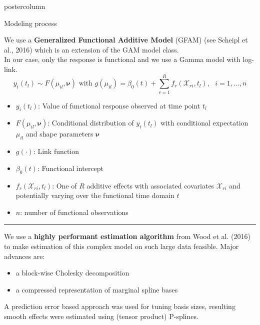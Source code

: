 \documentclass[final,hyperref={pdfpagelabels=false}]{beamer}
\newcommand{\bfBlue}[1]{\textcolor{koaladarkestblue}{\textbf{#1}}}
\newcommand*\circled[1]{\tikz[baseline=(char.base)]{
\node[shape=circle,draw,inner sep=2pt] (char) {#1};}}
\begin{document}
\begin{frame}
\begin{columns}
\begin{column}{1\textwidth}
\begin{columns}[T]
\begin{column}{.484\textwidth}
\begin{beamercolorbox}[center,wd=\textwidth]{postercolumn}
\begin{minipage}[T]{.95\textwidth}
\begin{block}{\footnotesize \circled{1} Modeling process}
\begin{minipage}[T]{.95\textwidth}  %
\vspace{1ex}
We use a \bfBlue{Generalized Functional Additive Model} (GFAM) (see Scheipl et al., 2016) which is an extension of the GAM model class.
\\
In our case, only the response is functional and we use a Gamma model with log-link.
\\
$$
y_i(t_l) \sim F(\mu_{il}, \boldsymbol{\nu}) \text{\ \ with\ \ } g(\mu_{il}) = \beta_0(t) + \sum\limits_{r=1}^R f_r(\boldsymbol{\mathcal{X}}_{ri}, t_l), \ \ \ i = 1,\ldots,n
$$
\begin{itemize}
  \item $y_i(t_l)$: Value of functional response observed at time point $t_l$
  \item $F(\mu_{il}, \boldsymbol{\nu})$: Conditional distribution of $y_i(t_l)$ with conditional expectation $\mu_{il}$ and shape parameters $\boldsymbol{\nu}$
  \item $g(\cdot)$: Link function
  \item $\beta_0(t)$: Functional intercept
  \item $f_r(\boldsymbol{\mathcal{X}}_{ri}, t_l)$: One of $R$ additive effects with associated covariates $\boldsymbol{\mathcal{X}}_{ri}$ and potentially varying over the functional time domain $t$
  \item $n$: number of functional observations
\end{itemize}
\vspace{2ex}

\noindent \textcolor[RGB]{220,220,220}{\rule{0.9\linewidth}{3pt}}
\vspace{2ex}

\noindent
We use a \bfBlue{highly performant estimation algorithm} from Wood et al. (2016) to make estimation of this complex model on such large data feasible. Major advances are:
\begin{itemize}
  \item a block-wise Cholesky decomposition
  \item a compressed representation of marginal spline bases
\end{itemize}
\vspace{1ex}
A prediction error based approach was used for tuning basis sizes, resulting smooth effects were estimated using (tensor product) P-splines.
\end{minipage}
\end{block}



\end{minipage}
\end{beamercolorbox}
\end{column}
\end{columns}
\end{column}
\end{columns}
\end{frame}
\end{document}

